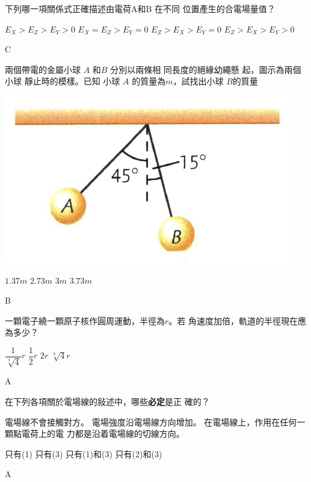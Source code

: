 {
    下列哪一項關係式正確描述由電荷A和B 在不同 位置產生的合電場量值？
    \begin{tasks}
        \task $E_X>E_Z>E_Y>0$
        \task $E_X=E_Z>E_Y=0$
        \task $E_Z>E_X>E_Y=0$
        \task $E_Z>E_X>E_Y>0$
    \end{tasks}
}{C}

{
    兩個帶電的金屬小球 $A$ 和$B$ 分別以兩條相 同長度的絕緣幼繩懸 起，圖示為兩個小球 靜止時的模樣。已知 小球 $A$ 的質量為$m$，試找出小球 $B$的質量
    \par{\par\centering\includegraphics[width=.35\textwidth]{./img/ch1_electrostatics_mc_2024-06-18-17-17-19.png}\par}
    \begin{tasks}
        \task $1.37m$
        \task $2.73m$
        \task $3m$
        \task $3.73m$
    \end{tasks}

}{B}

{
    一顆電子繞一顆原子核作圓周運動，半徑為$r$。若 角速度加倍，軌道的半徑現在應為多少？
    \begin{tasks}
        \task $\dfrac{1}{\sqrt[3]{4}}r$
        \task $\dfrac{1}{2}r$
        \task $2r$
        \task $\sqrt[3]{4}r$
    \end{tasks}

}{A}

{
    在下列各項關於電場線的敍述中，哪些\textbf{必定}是正 確的？
    \begin{statements}
        \task 電場線不會接觸對方。
        \task 電場強度沿電場線方向增加。
        \task 在電場線上，作用在任何一顆點電荷上的電 力都是沿着電場線的切線方向。
    \end{statements}
    \begin{tasks}
        \task 只有(1)
        \task 只有(3)
        \task 只有(1)和(3)
        \task 只有(2)和(3)
    \end{tasks}

}{A}


